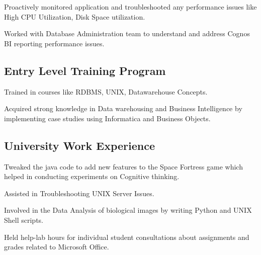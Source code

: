 \documentclass[]{pavan}
\begin{document}
{\begin{minipage}[t]{0.64\textwidth}
\begin{mdframed}[hidealllines=true,backgroundcolor=gray!5]
\begin{tightemize}
\item Proactively monitored application and troubleshooted any performance issues like High CPU Utilization, Disk Space utilization.

\item Worked with Database Administration team to understand and address Cognos BI reporting performance issues.

\end{tightemize}
\end{mdframed}
\vspace{-1.26em}
\begin{mdframed}[hidealllines=true,backgroundcolor=gray!5]
\section{Entry Level Training Program}

\begin{tightemize}
\item Trained in courses like RDBMS, UNIX, Datawarehouse Concepts.
\item Acquired strong knowledge in Data warehousing and Business Intelligence by implementing case studies using Informatica and Business Objects.
\end{tightemize}
\end{mdframed}
\vspace{-1.26em}
\begin{mdframed}[hidealllines=true,backgroundcolor=gray!5]
\section{University Work Experience}
\begin{tightemize}
\item Tweaked the java code to add new features to the Space Fortress game which helped in conducting experiments on Cognitive thinking.

\item Assisted in Troubleshooting UNIX Server Issues.

\item Involved in the Data Analysis of biological images by writing Python and UNIX Shell scripts.

\item Held help-lab hours for individual student consultations about assignments and grades related to Microsoft Office.

\end{tightemize}
\end{mdframed}



\end{minipage} }
\end{document}
